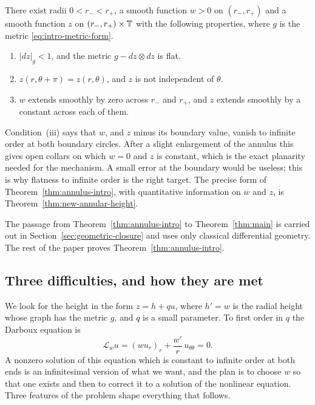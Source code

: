 \begin{maintheorem}\label{thm:annulus-intro}
There exist radii $0<r_-<r_+$, a smooth function $w>0$ on $(r_-,r_+)$
and a smooth function $z$ on $(r_-,r_+)\times\mathbb T$ with the following
properties, where $g$ is the metric \eqref{eq:intro-metric-form}.
\begin{enumerate}
\item $|dz|_g<1$, and the metric $g-dz\otimes dz$ is flat.
\item $z(r,\theta+\pi)=z(r,\theta)$, and $z$ is not independent of
 $\theta$.
\item $w$ extends smoothly by zero across $r_-$ and $r_+$, and $z$
 extends smoothly by a constant across each of them.
\end{enumerate}
\end{maintheorem}

Condition~(iii) says that $w$, and $z$ minus its boundary value, vanish
to infinite order at both boundary circles. After a slight enlargement
of the annulus this gives open collars on which $w=0$ and $z$ is
constant, which is the exact planarity needed for the mechanism. A
small error at the boundary would be useless; this is why flatness to
infinite order is the right target. The precise form of
Theorem~\ref{thm:annulus-intro}, with quantitative information on $w$
and $z$, is Theorem~\ref{thm:new-annular-height}.

The passage from Theorem~\ref{thm:annulus-intro} to
Theorem~\ref{thm:main} is carried out in
Section~\ref{sec:geometric-closure} and uses only classical
differential geometry. The rest of the paper proves
Theorem~\ref{thm:annulus-intro}.

\subsection{Three difficulties, and how they are met}
\label{subsec:difficulties}

We look for the height in the form $z=h+qu$, where $h'=w$ is the radial
height whose graph has the metric $g$, and $q$ is a small parameter. To
first order in $q$ the Darboux equation is
\begin{equation}\label{eq:intro-linear}
 \mathscr L_wu=(wu_r)_r+\frac{w'}{r}\,u_{\theta\theta}=0 .
\end{equation}
A nonzero solution of this equation which is constant to infinite order
at both ends is an infinitesimal version of what we want, and the plan
is to choose $w$ so that one exists and then to correct it to a
solution of the nonlinear equation. Three features of the problem shape
everything that follows.

